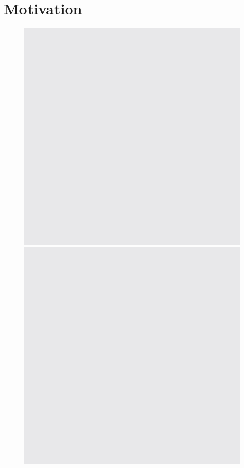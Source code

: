 \section{Motivation}
\label{c1_s:motivation}

\begin{figure}
    \begin{minipage}{0.48\textwidth}
        \includegraphics[width=\textwidth]{figures/fig.jpeg}    

    \end{minipage}
    \begin{minipage}{0.48\textwidth}
        \includegraphics[width=\textwidth]{figures/fig.jpeg}    


\end{minipage}
\end{figure}
